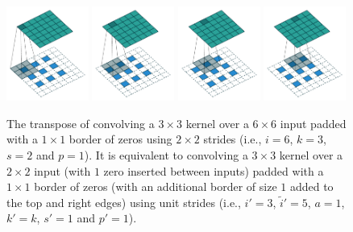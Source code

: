 \documentclass[notitlepage]{report}
\begin{document}
\begin{figure}[p]
    \centering
    \includegraphics[width=0.24\textwidth]{pdf/padding_strides_odd_transposed_00.pdf}
    \includegraphics[width=0.24\textwidth]{pdf/padding_strides_odd_transposed_01.pdf}
    \includegraphics[width=0.24\textwidth]{pdf/padding_strides_odd_transposed_02.pdf}
    \includegraphics[width=0.24\textwidth]{pdf/padding_strides_odd_transposed_03.pdf}
    \caption{\label{fig:padding_strides_odd_transposed} The transpose of
        convolving a $3 \times 3$ kernel over a $6 \times 6$ input padded with a
        $1 \times 1$ border of zeros using $2 \times 2$ strides (i.e., $i = 6$,
        $k = 3$, $s = 2$ and $p = 1$). It is equivalent to convolving a $3
        \times 3$ kernel over a $2 \times 2$ input (with $1$ zero inserted
        between inputs) padded with a $1 \times 1$ border of zeros (with an
        additional border of size $1$ added to the top and right edges) using
        unit strides (i.e., $i' = 3$, $\tilde{i}' = 5$, $a = 1$, $k' = k$, $s' =
        1$ and $p' = 1$).}
\end{figure}



\end{document}
